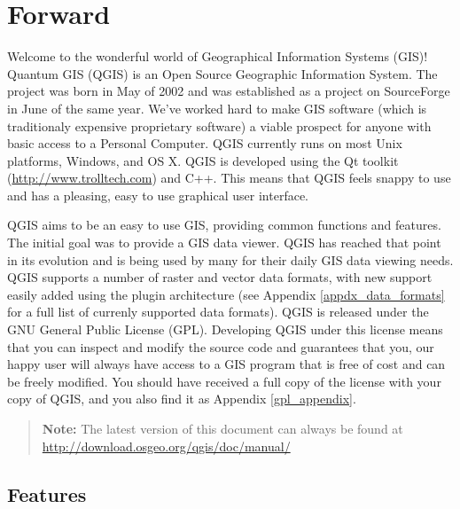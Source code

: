 
\section{Forward}\label{label_forward}
\setcounter{page}{1}

Welcome to the wonderful world of Geographical Information Systems (GIS)!
Quantum GIS (QGIS) is an Open Source Geographic Information System. The project
was born in May of 2002 and was established as a project on SourceForge in June
of the same year. We've worked hard to make GIS software (which is traditionaly
expensive proprietary software) a viable prospect for anyone with basic access
to a Personal Computer. QGIS currently runs on most Unix platforms, Windows, and
OS X. QGIS is developed using the Qt toolkit (\url{http://www.trolltech.com})
and C++. This means that QGIS feels snappy to use and has a pleasing, easy to
use graphical user interface. 

QGIS aims to be an easy to use GIS, providing common functions and features.
The initial goal was to provide a GIS data viewer. QGIS has reached that point
in its evolution and is being used by many for their daily GIS data viewing
needs. QGIS supports a number of raster and vector data formats, with new
support easily added using the plugin architecture (see Appendix
\ref{appdx_data_formats} for a full list of currenly supported data formats).
QGIS is released under the GNU General Public License (GPL). Developing QGIS 
under this license means that you can inspect and modify the source code
and guarantees that you, our happy user will always have access to a GIS
program that is free of cost and can be freely modified. You should have
received a full copy of the license with your copy of QGIS, and you also
find it as Appendix \ref{gpl_appendix}.  

\begin{quote}
\begin{center}
\textbf{Note:} The latest version of this document can always be found at \newline
\url{http://download.osgeo.org/qgis/doc/manual/}
\end{center}
\end{quote}

\subsection{Features}\label{label_majfeat}

